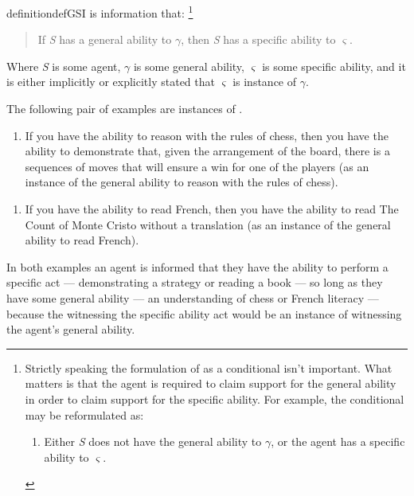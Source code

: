 \begin{note}
    \begin{restatable}[\gsi{}]{definition}{defGSI}\label{def:gsi}
     is information that:\nolinebreak
    \footnote{
      Strictly speaking the formulation of \gsi{} as a conditional isn't important.
      What matters is that the agent is required to claim support for the general ability in order to claim support for the specific ability.
      For example, the conditional may be reformulated as:
      \begin{enumerate}[label=(\gsi{}\('\)), ref=(\gsi{}\('\))]
      \item Either \emph{S} does not have the general ability to \(\gamma\), or the agent has a specific ability to \(\varsigma\).
      \end{enumerate}
    }
    \begin{quote}
      If \emph{S} has a general ability to \(\gamma\), then \emph{S} has a specific ability to \(\varsigma\).
    \end{quote}
    Where \emph{S} is some agent, \(\gamma\) is some general ability, \(\varsigma\) is some specific ability, and it is either implicitly or explicitly stated that \(\varsigma\) is instance of \(\gamma\).
  \end{restatable}
  
  The following pair of examples are instances of \gsi{}.
  \begin{enumerate}[label=(\gsi{}:\arabic*), ref=(\gsi{}:\arabic*)]
  \item\label{qe:cond} If you have the ability to reason with the rules of chess, then you have the ability to demonstrate that, given the arrangement of the board, there is a sequences of moves that will ensure a win for one of the players (as an instance of the general ability to reason with the rules of chess).
  \end{enumerate}

  \begin{enumerate}[label=(\gsi{}:\arabic*), ref=(\gsi{}:\arabic*), resume]
  \item\label{qe:cond:french} If you have the ability to read French, then you have the ability to read The Count of Monte Cristo without a translation (as an instance of the general ability to read French).
  \end{enumerate}
  In both examples an agent is informed that they have the ability to perform a specific act --- demonstrating a strategy or reading a book --- so long as they have some general ability --- an understanding of chess or French literacy --- because the witnessing the specific ability act would be an instance of witnessing the agent's general ability.


\end{note}
